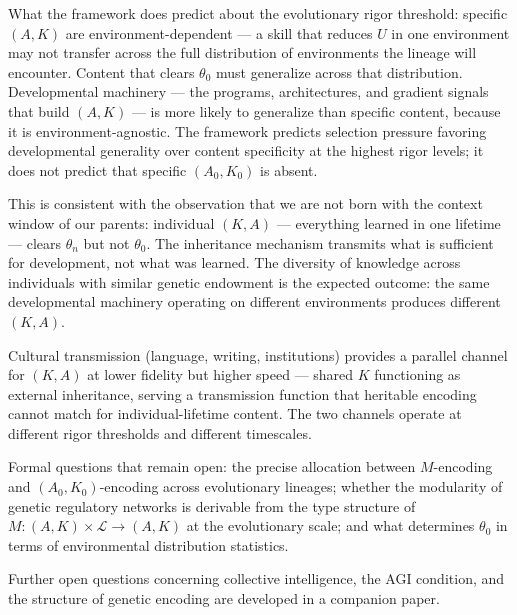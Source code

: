 \documentclass[
]{article}
\begin{document}
\begin{enumerate}
  What the framework does predict about the evolutionary rigor
  threshold: specific \((A, K)\) are environment-dependent --- a skill
  that reduces \(U\) in one environment may not transfer across the full
  distribution of environments the lineage will encounter. Content that
  clears \(\theta_0\) must generalize across that distribution.
  Developmental machinery --- the programs, architectures, and gradient
  signals that build \((A, K)\) --- is more likely to generalize than
  specific content, because it is environment-agnostic. The framework
  predicts selection pressure favoring developmental generality over
  content specificity at the highest rigor levels; it does not predict
  that specific \((A_0, K_0)\) is absent.

  This is consistent with the observation that we are not born with the
  context window of our parents: individual \((K, A)\) --- everything
  learned in one lifetime --- clears \(\theta_n\) but not \(\theta_0\).
  The inheritance mechanism transmits what is sufficient for
  development, not what was learned. The diversity of knowledge across
  individuals with similar genetic endowment is the expected outcome:
  the same developmental machinery operating on different environments
  produces different \((K, A)\).

  Cultural transmission (language, writing, institutions) provides a
  parallel channel for \((K, A)\) at lower fidelity but higher speed ---
  shared \(K\) functioning as external inheritance,
  serving a transmission function that heritable encoding cannot match for
  individual-lifetime content. The two channels operate at different
  rigor thresholds and different timescales.

  Formal questions that remain open: the precise allocation between
  \(M\)-encoding and \((A_0, K_0)\)-encoding across evolutionary
  lineages; whether the modularity of genetic regulatory networks is
  derivable from the type structure of
  \(M : (A, K) \times \mathcal{L} \rightarrow (A, K)\) at the
  evolutionary scale; and what determines \(\theta_0\) in terms of
  environmental distribution statistics.
\end{enumerate}

Further open questions concerning collective intelligence, the AGI
condition, and the structure of genetic encoding are developed in a
companion paper.
\end{document}
